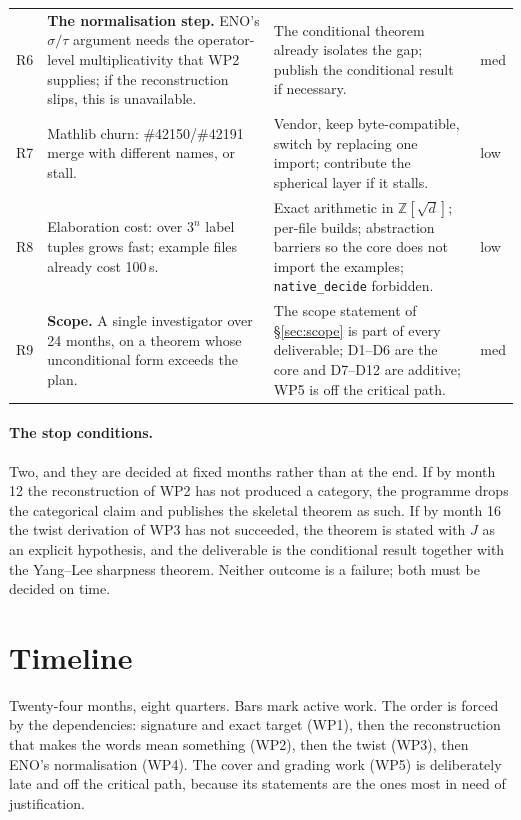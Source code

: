 \documentclass[11pt,a4paper]{article}
\theoremstyle{remark}
\newcommand{\code}[1]{\texttt{\detokenize{#1}}}
\newcommand{\Z}{\mathbb{Z}}
\begin{document}
{\begin{longtable}{@{}>{\raggedright\arraybackslash}p{}>{\raggedright\arraybackslash}p{}>{\raggedright\arraybackslash}p{}>{\raggedright\arraybackslash}p{}@{}}
R6 & \textbf{The normalisation step.} ENO's $\sigma/\tau$ argument needs the operator-level
multiplicativity that WP2 supplies; if the reconstruction slips, this is unavailable. & The
conditional theorem \code{eno823_of_pseudoUnitary} already isolates the gap; publish the
conditional result if necessary. & med \\
R7 & Mathlib churn: \#42150/\#42191 merge with different names, or stall. & Vendor, keep
byte-compatible, switch by replacing one import; contribute the spherical layer if it stalls. &
low \\
R8 & Elaboration cost: \code{decide} over $3^{n}$ label tuples grows fast; example files already
cost 100\,s. & Exact arithmetic in $\Z[\sqrt d]$; per-file builds; abstraction barriers so the
core does not import the examples; \texttt{native\_decide} forbidden. & low \\
R9 & \textbf{Scope.} A single investigator over 24 months, on a theorem whose unconditional form
exceeds the plan. & The scope statement of \S\ref{sec:scope} is part of every deliverable; D1--D6
are the core and D7--D12 are additive; WP5 is off the critical path. & med \\
\end{longtable}
}

\paragraph{The stop conditions.} Two, and they are decided at fixed months rather than at the
end. If by month 12 the reconstruction of WP2 has not produced a category, the programme drops
the categorical claim and publishes the skeletal theorem as such. If by month 16 the twist
derivation of WP3 has not succeeded, the theorem is stated with $J$ as an explicit hypothesis,
and the deliverable is the conditional result together with the Yang--Lee sharpness theorem.
Neither outcome is a failure; both must be decided on time.

\section{Timeline}\label{sec:timeline}

Twenty-four months, eight quarters. Bars mark active work. The order is forced by the
dependencies: signature and exact target (WP1), then the reconstruction that makes the words
mean something (WP2), then the twist (WP3), then ENO's normalisation (WP4). The cover and grading
work (WP5) is deliberately late and off the critical path, because its statements are the ones
most in need of justification.
\end{document}
